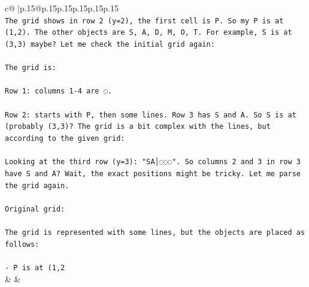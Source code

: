 \documentclass{article}
\begin{document}
{\begin{supertabular}{c@{$\;$}|p{.15\linewidth}@{}p{.15\linewidth}p{.15\linewidth}p{.15\linewidth}p{.15\linewidth}p{.15\linewidth}}
{{{\\ 
\texttt{The grid shows in row 2 (y=2), the first cell is P. So my P is at (1,2). The other objects are S, A, D, M, O, T. For example, S is at (3,3) maybe? Let me check the initial grid again:} \\
\\ 
\texttt{The grid is:} \\
\\ 
\texttt{Row 1: columns 1{-}4 are ◌.} \\
\\ 
\texttt{Row 2: starts with P, then some lines. Row 3 has S and A. So S is at (probably (3,3)? The grid is a bit complex with the lines, but according to the given grid:} \\
\\ 
\texttt{Looking at the third row (y=3): "SA│◌◌◌". So columns 2 and 3 in row 3 have S and A? Wait, the exact positions might be tricky. Let me parse the grid again.} \\
\\ 
\texttt{Original grid:} \\
\\ 
\texttt{The grid is represented with some lines, but the objects are placed as follows:} \\
\\ 
\texttt{{-} P is at (1,2} \\
            }
        }
    }
    & & \\ \\


\end{supertabular}}
\end{document}
